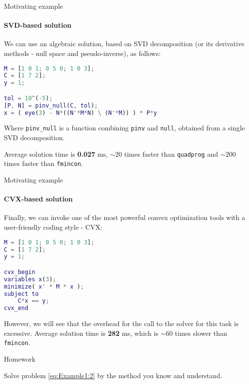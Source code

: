 \documentclass{beamer}
\begin{document}
\begin{frame}[fragile]{Motivating example}
\framesubtitle{SVD-based solution}
\begin{flushleft}

We can use an algebraic solution, based on SVD decomposition (or its derivative methods - null space and pseudo-inverse), as follows:

\begin{lstlisting}[language=Matlab]
M = [1 0 1; 0 5 0; 1 0 3]; 
C = [1 7 2]; 
y = 1;

tol = 10^(-5);
[P, N] = pinv_null(C, tol);
x = ( eye(3) - N*((N'*M*N) \ (N'*M)) ) * P*y
\end{lstlisting}

Where \texttt{pinv\_null} is a function combining \texttt{pinv} and \texttt{null}, obtained from a single SVD decomposition.

Average solution time is \textbf{0.027} ms, $\sim 20$ times faster than \texttt{quadprog} and $\sim 200$ times faster than \texttt{fmincon}.

\end{flushleft}
\end{frame}



\begin{frame}[fragile]{Motivating example}
\framesubtitle{CVX-based solution}
\begin{flushleft}

Finally, we can invoke one of the most powerful convex optimization tools with a user-friendly coding style - CVX:

\begin{lstlisting}[language=Matlab]
M = [1 0 1; 0 5 0; 1 0 3];
C = [1 7 2];
y = 1;

cvx_begin
variables x(3);
minimize( x' * M * x );
subject to
    C*x == y;
cvx_end
\end{lstlisting}

However, we will see that the overhead for the call to the solver for this task is excessive. Average solution time is \textbf{282} ms, which is $\sim 60$ times slower than \texttt{fmincon}.

\end{flushleft}
\end{frame}




\begin{frame}{Homework}
\begin{flushleft}

Solve problem \eqref{eq:Example1:2} by the method you know and understand.

\end{flushleft}
\end{frame}
\end{document}
